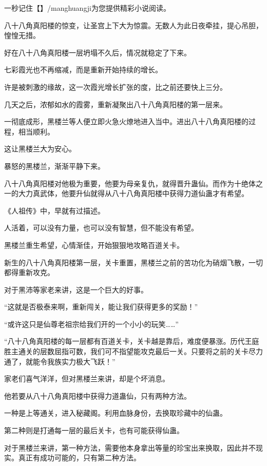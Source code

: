 
\begin{this_body}

一秒记住【】/manghuangji为您提供精彩小说阅读。

八十八角真阳楼的惊变，让圣宫上下大为惊震。无数人为此日夜牵挂，提心吊胆，惶惶无措。

好在八十八角真阳楼一层坍塌不久后，情况就稳定了下来。

七彩霞光也不再缩减，而是重新开始持续的增长。

许是被刺激的缘故，这一次霞光增长扩张的度，比之前还要快上三分。

几天之后，浓郁如水的霞雾，重新凝聚出八十八角真阳楼的第一层来。

一彻底成形，黑楼兰等人便立即火急火燎地进入当中。进出八十八角真阳楼的过程，相当顺利。

这让黑楼兰大为安心。

暴怒的黑楼兰，渐渐平静下来。

八十八角真阳楼对他极为重要，他要为母亲复仇，就得晋升蛊仙。而作为十绝体之一的大力真武体，他要升仙就得从八十八角真阳楼中获得力道仙蛊才有希望。

《人祖传》中，早就有过描述。

人活着，可以没有力量，也可以没有智慧，但不能没有希望。

黑楼兰重生希望，心情渐佳，开始狠狠地攻略百道关卡。

新生的八十八角真阳楼第一层，关卡重置，黑楼兰之前的苦功化为硝烟飞散，一切都得重新攻克。

对于黑沛等家老来讲，这是一个巨大的好事。

“这就是否极泰来啊，重新闯关，能让我们获得更多的奖励！”

“或许这只是仙尊老祖宗给我们开的一个小小的玩笑……”

“八十八角真阳楼的每一层都有百道关卡，关卡越是靠后，难度便暴涨。历代王庭胜主通关的层数屈指可数，我们可不指望能攻克最后一关。只要将之前的关卡尽力通了，就能令我族实力极大飞跃！”

家老们喜气洋洋，但对黑楼兰来讲，却是个坏消息。

他若要从八十八角真阳楼中获得力道蛊仙，只有两种方法。

一种是上等通关，进入秘藏阁。利用血脉身份，去换取珍藏中的仙蛊。

第二种则是打通每一层的最后关卡，也有可能获得仙蛊。

对于黑楼兰来讲，第一种方法，需要他本身拿出等量的珍宝出来换取，因此并不现实。真正有成功可能的，只有第二种方法。


\end{this_body}
